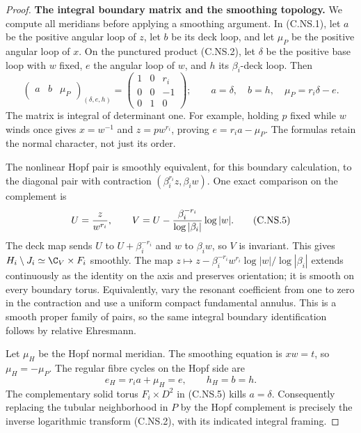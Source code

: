 \begin{proof}
\par\medskip\noindent\textbf{The integral boundary matrix and the smoothing topology.}
We compute all meridians before applying a smoothing
argument. In (C.NS.1), let $a$ be the positive angular
loop of $z$, let $b$ be its deck loop, and let
$\mu_P$ be the positive angular loop of $x$. On the
punctured product (C.NS.2), let $\delta$ be the
positive base loop with $w$ fixed, $e$ the angular
loop of $w$, and $h$ its $\beta_i$-deck loop. Then
\[
 \begin{pmatrix}a&b&\mu_P\end{pmatrix}_{(\delta,e,h)}
       =
 \begin{pmatrix}
  1&0&r_i\\
  0&0&-1\\
  0&1&0
 \end{pmatrix};
 \qquad
 a=\delta,\quad b=h,\quad \mu_P=r_i\delta-e.
                                                        \tag{C.NS.4}
\]
The matrix is integral of determinant one. For example,
holding $p$ fixed while $w$ winds once gives
$x=w^{-1}$ and $z=pw^{r_i}$, proving
$e=r_i a-\mu_P$. The formulas retain the normal
character, not just its order.

The nonlinear Hopf pair is smoothly equivalent, for
this boundary calculation, to the diagonal pair with
contraction $(\beta_i^{r_i}z,\beta_i w)$. One exact
comparison on the complement is
\[
 U={z\over w^{r_i}},\qquad
 V=U-{\beta_i^{-r_i}\over\log|\beta_i|}\log|w|.
                                                        \tag{C.NS.5}
\]
The deck map sends $U$ to $U+\beta_i^{-r_i}$ and
$w$ to $\beta_iw$, so $V$ is invariant. This gives
$H_i\setminus J_i\simeq\C_V\times F_i$ smoothly.
The map
$z\mapsto z-\beta_i^{-r_i}w^{r_i}\log|w|/\log|\beta_i|$
extends continuously as the identity on the axis and
preserves orientation; it is smooth on every boundary
torus. Equivalently, vary the resonant coefficient from
one to zero in the contraction and use a uniform
compact fundamental annulus. This is a smooth proper
family of pairs, so the same integral boundary
identification follows by relative Ehresmann.

Let $\mu_H$ be the Hopf normal meridian. The
smoothing equation is $xw=t$, so
$\mu_H=-\mu_P$. The regular fibre cycles on the
Hopf side are
\[
                   e_H=r_i a+\mu_H=e,\qquad h_H=b=h.
                                                        \tag{C.NS.6}
\]
The complementary solid torus $F_i\times D^2$ in
(C.NS.5) kills $a=\delta$. Consequently replacing
the tubular neighborhood in $P$ by the Hopf
complement is precisely the inverse logarithmic
transform (C.NS.2), with its indicated integral
framing.


\end{proof}

